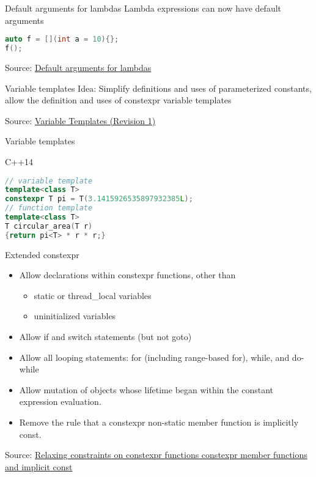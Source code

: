 \documentclass{beamer}
\begin{document}
\begin{frame}[fragile]{Default arguments for lambdas}
Lambda expressions can now have default arguments
\begin{lstlisting}[firstnumber=1, label=glabels, xleftmargin=5pt, language=C++] 
auto f = [](int a = 10){}; 
f();
\end{lstlisting}
\vfill
Source: \href{http://www.open-std.org/jtc1/sc22/wg21/docs/cwg_defects.html#974}{Default arguments for lambdas}
\end{frame}


\begin{frame}{Variable templates}
Idea: Simplify definitions and uses of parameterized constants, allow the definition and uses of constexpr variable templates

\vfill
Source: \href{http://www.open-std.org/jtc1/sc22/wg21/docs/papers/2013/n3651.pdf}{Variable Templates (Revision 1)}
\end{frame}

\begin{frame}[fragile]{Variable templates}
\begin{block}{C++14}
\begin{lstlisting}[firstnumber=1, label=glabels, xleftmargin=5pt, language=C++] 
// variable template
template<class T>
constexpr T pi = T(3.1415926535897932385L);
// function template
template<class T>
T circular_area(T r)
{return pi<T> * r * r;}
\end{lstlisting}
\end{block}
\end{frame}

\begin{frame}{Extended constexpr}
\begin{itemize}
\item Allow declarations within constexpr functions, other than
\begin{itemize}
\item static or thread\_local variables 
\item uninitialized variables
\end{itemize}
\item Allow if and switch statements (but not goto)
\item Allow all looping statements: for (including range-based for), while, and do-while
\item Allow mutation of objects whose lifetime began within the constant expression evaluation.
\item Remove the rule that a constexpr non-static member function is implicitly const.
\end{itemize}

\vfill
Source: \href{http://www.open-std.org/jtc1/sc22/wg21/docs/papers/2013/n3652.html}{Relaxing constraints on constexpr functions constexpr member functions and implicit const}
\end{frame}
\end{document}
